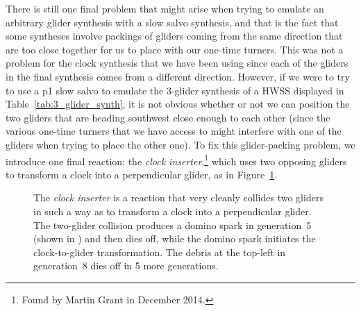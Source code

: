 There is still one final problem that might arise when trying to emulate an arbitrary glider synthesis with a slow salvo synthesis, and that is the fact that some syntheses involve packings of gliders coming from the same direction that are too close together for us to place with our one-time turners. This was not a problem for the clock synthesis that we have been using since each of the gliders in the final synthesis comes from a different direction. However, if we were to try to use a p1 slow salvo to emulate the 3-glider synthesis of a HWSS displayed in Table~\ref{tab:3_glider_synth}, it is not obvious whether or not we can position the two gliders that are heading southwest close enough to each other (since the various one-time turners that we have access to might interfere with one of the gliders when trying to place the other one). To fix this glider-packing problem, we introduce one final reaction: the \emph{clock inserter},\footnote{Found by Martin Grant in December 2014.} which uses two opposing gliders to transform a clock into a perpendicular glider, as in Figure~\ref{fig:clock_inserter}.
\begin{figure}[!ht]
	\centering
	\caption{The \emph{clock inserter} is a reaction that very cleanly collides two gliders in such a way as to transform a clock into a perpendicular glider. The two-glider collision produces a domino spark in generation~5 (shown in ) and then dies off, while the domino spark initiates the clock-to-glider transformation. The debris at the top-left in generation~8 dies off in 5 more generations.}\label{fig:clock_inserter}
\end{figure}

